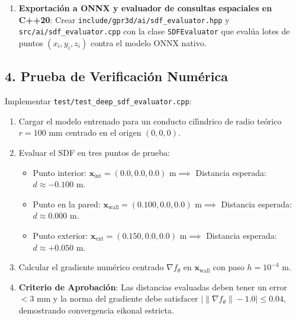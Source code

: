 \documentclass[11pt,a4paper]{article}
\begin{document}
\begin{enumerate}
\begin{verbatim}
    # 2. Perdida Eikonal por diferenciacion automatica exacta
    grad_outputs = torch.ones_like(pred_sdf)
    grad = torch.autograd.grad(
        outputs=pred_sdf,
        inputs=coords,
        grad_outputs=grad_outputs,
        create_graph=True,
        retain_graph=True,
        only_inputs=True
    )[0]
    grad_norm = torch.norm(grad, dim=-1)
    loss_eik = torch.mean((grad_norm - 1.0) ** 2)
    
    total_loss = loss_sdf + lambda_eik * loss_eik
    return total_loss, loss_sdf, loss_eik
\end{verbatim}

    \item \textbf{Exportaci{\'o}n a ONNX y evaluador de consultas espaciales en C++20}:
    Crear \texttt{include/gpr3d/ai/sdf\_evaluator.hpp} y \texttt{src/ai/sdf\_evaluator.cpp} con la clase \texttt{SDFEvaluator} que eval{\'u}a lotes de puntos $(x_i, y_i, z_i)$ contra el modelo ONNX nativo.
\end{enumerate}

\subsection{4. Prueba de Verificaci{\'o}n Num{\'e}rica}
Implementar \texttt{test/test\_deep\_sdf\_evaluator.cpp}:
\begin{enumerate}
    \item Cargar el modelo entrenado para un conducto cil{\'\i}ndrico de radio te{\'o}rico $r = 100\text{ mm}$ centrado en el origen $(0, 0, 0)$.
    \item Evaluar el SDF en tres puntos de prueba:
    \begin{itemize}
        \item Punto interior: $\mathbf{x}_{\text{int}} = (0.0, 0.0, 0.0)\text{ m} \implies$ Distancia esperada: $d \approx -0.100\text{ m}$.
        \item Punto en la pared: $\mathbf{x}_{\text{wall}} = (0.100, 0.0, 0.0)\text{ m} \implies$ Distancia esperada: $d \approx 0.000\text{ m}$.
        \item Punto exterior: $\mathbf{x}_{\text{ext}} = (0.150, 0.0, 0.0)\text{ m} \implies$ Distancia esperada: $d \approx +0.050\text{ m}$.
    \end{itemize}
    \item Calcular el gradiente num{\'e}rico centrado $\nabla f_\theta$ en $\mathbf{x}_{\text{wall}}$ con paso $h = 10^{-4}\text{ m}$.
    \item \textbf{Criterio de Aprobaci{\'o}n}: Las distancias evaluadas deben tener un error $< 3\text{ mm}$ y la norma del gradiente debe satisfacer $|\|\nabla f_\theta\| - 1.0| \le 0.04$, demostrando convergencia eikonal estricta.
\end{enumerate}
\end{document}
